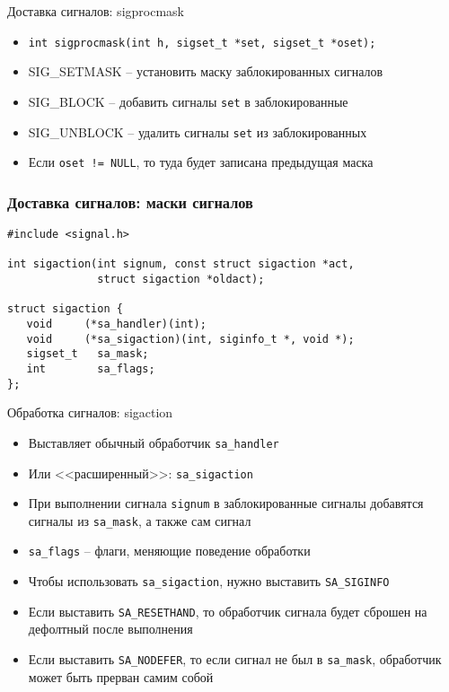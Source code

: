 \documentclass[10pt,pdf,hyperref={unicode}]{beamer}
\begin{document}
\begin{frame}{Доставка сигналов: sigprocmask}
\begin{itemize}
    \item \texttt{int sigprocmask(int h, sigset_t *set, sigset_t *oset);}
    \item SIG\_SETMASK -- установить маску заблокированных сигналов
    \item SIG\_BLOCK -- добавить сигналы \texttt{set} в заблокированные
    \item SIG\_UNBLOCK -- удалить сигналы \texttt{set} из заблокированных
    \item Если \texttt{oset != NULL}, то туда будет записана предыдущая маска
\end{itemize}
\end{frame}

\begin{frame}[fragile]
\frametitle{Доставка сигналов: маски сигналов}
\begin{center}
\begin{minipage}{0.95\textwidth}
\begin{verbatim}
#include <signal.h>

int sigaction(int signum, const struct sigaction *act,
              struct sigaction *oldact);

struct sigaction {
   void     (*sa_handler)(int);
   void     (*sa_sigaction)(int, siginfo_t *, void *);
   sigset_t   sa_mask;
   int        sa_flags;
};
\end{verbatim}
\end{minipage}
\end{center}
\end{frame}

\begin{frame}{Обработка сигналов: sigaction}
\begin{itemize}
    \item Выставляет обычный обработчик \texttt{sa_handler}
    \item Или <<расширенный>>: \texttt{sa_sigaction}
    \item При выполнении сигнала \texttt{signum} в заблокированные сигналы добавятся сигналы из \texttt{sa_mask}, а также сам сигнал
    \item \texttt{sa_flags} -- флаги, меняющие поведение обработки
    \item Чтобы использовать \texttt{sa_sigaction}, нужно выставить \texttt{SA_SIGINFO}
    \item Если выставить \texttt{SA_RESETHAND}, то обработчик сигнала будет сброшен на дефолтный после выполнения
    \item Если выставить \texttt{SA_NODEFER}, то если сигнал не был в \texttt{sa_mask}, обработчик может быть прерван самим собой
\end{itemize}
\end{frame}
\end{document}
